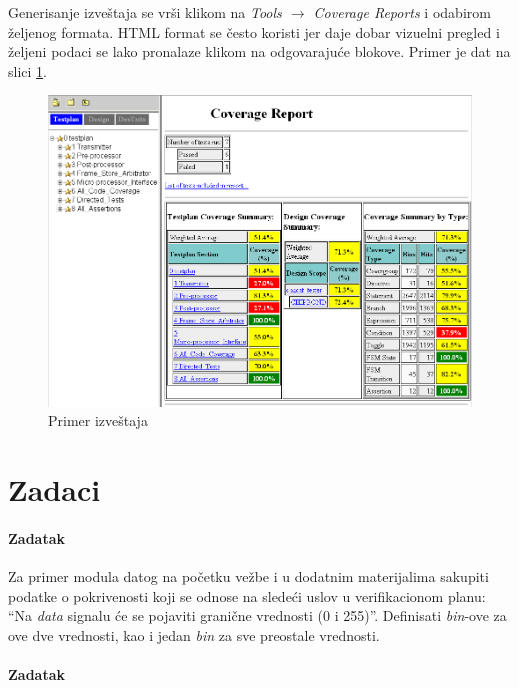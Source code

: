Generisanje izveštaja se vrši klikom na \emph{Tools \(\rightarrow\) Coverage
  Reports} i odabirom željenog formata. HTML format se često koristi jer daje
dobar vizuelni pregled i željeni podaci se lako pronalaze klikom na odgovarajuće
blokove. Primer je dat na slici \ref{fig:questa_coverage_report}.

\begin{figure}[h!]
  \center
  \includegraphics[width=\textwidth]{img/v11_questa_coverage_report.png}
  \caption{Primer izveštaja}
  \label{fig:questa_coverage_report}
\end{figure}


\section{Zadaci}

\paragraph{Zadatak}

Za primer modula datog na početku vežbe i u dodatnim materijalima sakupiti
podatke o pokrivenosti koji se odnose na sledeći uslov u verifikacionom planu:
``Na \emph{data} signalu će se pojaviti granične vrednosti (0 i 255)''.
Definisati \emph{bin}-ove za ove dve vrednosti, kao i jedan \emph{bin} za sve
preostale vrednosti.

\paragraph{Zadatak}

